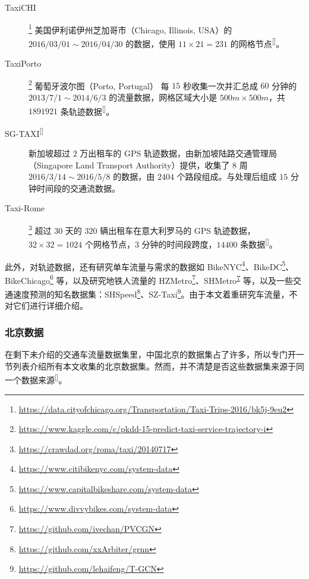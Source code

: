 \documentclass{ctexart}
\renewcommand{\cite}[1]{\textsuperscript{[\citenum{#1}]}}
\begin{document}
\begin{description}
    \item[TaxiCHI]\footnote{\url{https://data.cityofchicago.org/Transportation/Taxi-Trips-2016/bk5j-9eu2}} 美国伊利诺伊州芝加哥市（Chicago, Illinois, USA）的 $2016/03/01\sim2016/04/30$ 的数据，使用 $11\times21=231$ 的网格节点\cite{T-301}。
    \item[TaxiPorto]\footnote{\url{https://www.kaggle.com/c/pkdd-15-predict-taxi-service-trajectory-i}} 葡萄牙波尔图（Porto, Portugal） 每 $15$ 秒收集一次并汇总成 $60$ 分钟的 $2013/7/1\sim2014/6/3$ 的流量数据，网格区域大小是 $500m\times500m$，共 $1891921$ 条轨迹数据\cite{T-343}。
    \item[SG-TAXI\cite{T-292}] 新加坡超过 $2$ 万出租车的 GPS 轨迹数据，由新加坡陆路交通管理局（Singapore Land Transport Authority）提供，收集了 $8$ 周 $2016/3/14\sim2016/5/8$ 的数据，由 $2404$ 个路段组成。与处理后组成 $15$ 分钟时间段的交通流数据。
    \item[Taxi-Rome]\footnote{\url{https://crawdad.org/roma/taxi/20140717}} 超过 $30$ 天的 $320$ 辆出租车在意大利罗马的 GPS 轨迹数据，$32\times32=1024$ 个网格节点，$3$ 分钟的时间段跨度，$14400$ 条数据\cite{T-297}。
\end{description}

此外，对轨迹数据，还有研究单车流量与需求的数据如 BikeNYC\footnote{\url{https://www.citibikenyc.com/system-data}}、BikeDC\footnote{\url{https://www.capitalbikeshare.com/system-data}}、BikeChicago\footnote{\url{https://www.divvybikes.com/system-data}} 等，以及研究地铁人流量的 HZMetro\footnote{\url{https://github.com/ivechan/PVCGN}\label{pvcgn}}、SHMetro\textsuperscript{\ref{pvcgn}} 等，以及一些交通速度预测的知名数据集：SHSpeed\footnote{\url{https://github.com/xxArbiter/grnn}}、SZ-Taxi\footnote{\url{https://github.com/lehaifeng/T-GCN}}。由于本文着重研究车流量，不对它们进行详细介绍。

\subsubsection{北京数据}
在剩下未介绍的交通车流量数据集里，中国北京的数据集占了许多，所以专门开一节列表介绍所有本文收集的北京数据集。然而，并不清楚是否这些数据集来源于同一个数据来源\cite{T-ZS1}。
\end{document}
